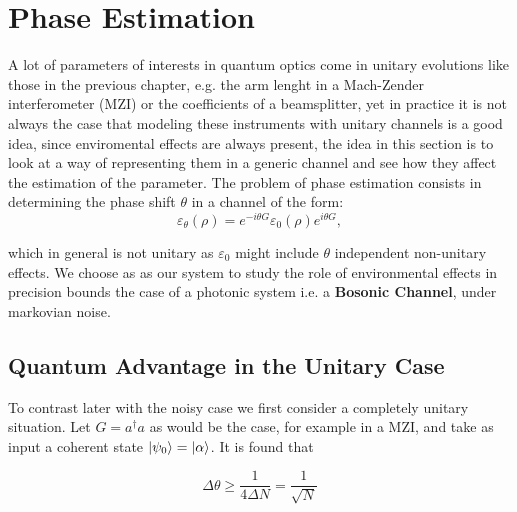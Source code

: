 \section{Phase Estimation}
A lot of parameters of interests in quantum optics come in unitary evolutions like those in the previous chapter, e.g. the arm lenght in a Mach-Zender interferometer (MZI) or the coefficients of a beamsplitter, yet in practice it is not always the case that modeling these instruments
with unitary channels is a good idea, since enviromental effects are always present, the idea in this section is to look at a way
of representing them in a generic channel and see how they affect the estimation of the parameter.
The problem of phase estimation consists in determining the phase shift $\theta$ in a channel of the form:
\begin{equation}
  \varepsilon_{\theta}(\rho) = e^{-i\theta G}\varepsilon_{0}(\rho)e^{i\theta G},
\end{equation}

which in general is not unitary as $\varepsilon_{0}$ might include $\theta$ independent non-unitary effects. We choose as
as our system to study the role of environmental effects in precision bounds the case of a photonic system i.e. a \textbf{Bosonic Channel},
under markovian noise.
\subsection{Quantum Advantage in the Unitary Case}
To contrast later with the noisy case we first consider a completely unitary situation. Let $G=a^{\dagger}a$ as would be the case, for example in a MZI, and take as input a coherent state $\ket{\psi_{0}}=\ket{\alpha}$. It is found
that \cite{barbieri_optical_2022}

\begin{equation}\label{eq:shot_noise}
\Delta \theta \geq \frac{1}{4\Delta N}=\frac{1}{\sqrt{N}}
\end{equation}

